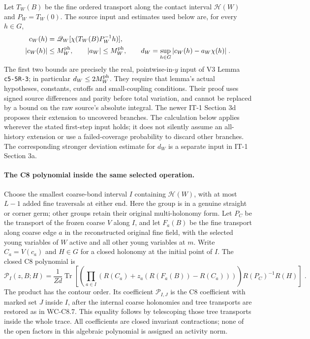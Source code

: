 \documentclass[11pt]{article}
\begin{document}
Let $T_W(B)$ be the fine ordered transport along the contact interval
$\mathcal H(W)$ and $P_W=T_W(0)$. The source input and estimates used
below are, for every $h\in G$,
\begin{equation}\label{eq:c8-fourth-seed-input}
    \begin{aligned}
        c_W(h)&=\mathscr Q_W[
            \chi(T_W(B)P_W^{-1}h)],\\
        |c_W(h)|&\leq M_W^{\rm ph},\qquad
        |a_W|\leq M_W^{\rm ph},\qquad
        d_W=\sup_{h\in G}|c_W(h)-a_W\chi(h)|\;.
    \end{aligned}
\end{equation}
The first two bounds are precisely the real, pointwise-in-$y$
input of V3 Lemma \texttt{c5-5R-3}; in particular
$d_W\leq2M_W^{\rm ph}$. They require that lemma's actual hypotheses,
constants, cutoffs and small-coupling conditions. Their proof uses
signed source differences and parity before total variation, and
cannot be replaced by a bound on the raw source's absolute integral.
The newer IT-1 Section 3d proposes their extension to uncovered
branches. The calculation below applies wherever the stated
first-step input holds; it does not silently assume an all-history
extension or use a failed-coverage probability to discard other
branches. The corresponding stronger deviation estimate for $d_W$
is a separate input in IT-1 Section 3a.

\paragraph{The C8 polynomial inside the same selected operation.}
Choose the smallest coarse-bond interval $I$ containing
$\mathcal H(W)$, with at most $L-1$ added fine traversals at either
end. Here the group is in a genuine straight or corner germ; other
groups retain their original multi-holonomy form. Let $P_C$ be
the transport of the frozen coarse $V$ along $I$, and let
$F_a(B)$ be the fine transport along coarse edge $a$ in the
reconstructed original fine field, with the selected young
variables of $W$ active and all other young variables at $m$.
Write $C_a=V(c_a)$ and $H\in G$ for a closed holonomy at the
initial point of $I$. The closed C8 polynomial is
\begin{equation}\label{eq:c8-fourth-local-polynomial}
    \mathcal P_I(z,B;H)
        =\frac{1}{Zd}\operatorname{Tr}\left[
            \left(\prod_{a\in I}
                (R(C_a)+z_a(R(F_a(B))-R(C_a)))\right)
            R(P_C)^{-1}R(H)\right]\;.
\end{equation}
The product has the contour order. Its coefficient
$\mathcal P_{I,J}$ is the C8 coefficient with marked set $J$
inside $I$, after the internal coarse holonomies and tree
transports are restored as in WC-C8.7. This equality follows by
telescoping those tree transports inside the whole trace.
All coefficients are closed invariant contractions; none of the
open factors in this algebraic polynomial is assigned an activity
norm.
\end{document}
